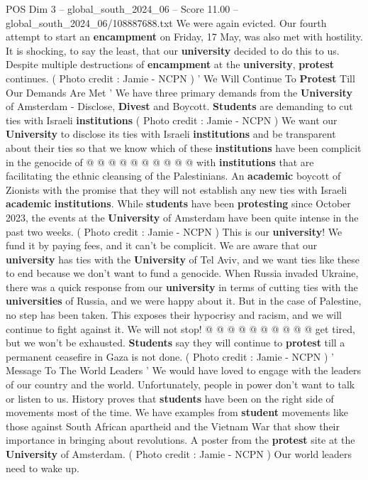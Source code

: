 \begin{textsample}{POS Dim 3 – global\_south\_2024\_06 – Score 11.00 – global\_south\_2024\_06/108887688.txt}
We were again evicted.
Our fourth attempt to start an \textbf{encampment} on Friday, 17 May, was also met with hostility.
It is shocking, to say the least, that our \textbf{university} decided to do this to us.
Despite multiple destructions of \textbf{encampment} at the \textbf{university}, \textbf{protest} continues. ( Photo credit : Jamie - NCPN ) ' We Will Continue To \textbf{Protest} Till Our Demands Are Met ' We have three primary demands from the \textbf{University} of Amsterdam - Disclose, \textbf{Divest} and Boycott. \textbf{Students} are demanding to cut ties with Israeli \textbf{institutions} ( Photo credit : Jamie - NCPN ) We want our \textbf{University} to disclose its ties with Israeli \textbf{institutions} and be transparent about their ties so that we know which of these \textbf{institutions} have been complicit in the genocide of @ @ @ @ @ @ @ @ @ @ with \textbf{institutions} that are facilitating the ethnic cleansing of the Palestinians.
An \textbf{academic} boycott of Zionists with the promise that they will not establish any new ties with Israeli \textbf{academic} \textbf{institutions}.
While \textbf{students} have been \textbf{protesting} since October 2023, the events at the \textbf{University} of Amsterdam have been quite intense in the past two weeks. ( Photo credit : Jamie - NCPN ) This is our \textbf{university}!
We fund it by paying fees, and it can't be complicit.
We are aware that our \textbf{university} has ties with the \textbf{University} of Tel Aviv, and we want ties like these to end because we don't want to fund a genocide.
When Russia invaded Ukraine, there was a quick response from our \textbf{university} in terms of cutting ties with the \textbf{universities} of Russia, and we were happy about it.
But in the case of Palestine, no step has been taken.
This exposes their hypocrisy and racism, and we will continue to fight against it.
We will not stop! @ @ @ @ @ @ @ @ @ @ get tired, but we won't be exhausted. \textbf{Students} say they will continue to \textbf{protest} till a permanent ceasefire in Gaza is not done. ( Photo credit : Jamie - NCPN ) ' Message To The World Leaders ' We would have loved to engage with the leaders of our country and the world.
Unfortunately, people in power don't want to talk or listen to us.
History proves that \textbf{students} have been on the right side of movements most of the time.
We have examples from \textbf{student} movements like those against South African apartheid and the Vietnam War that show their importance in bringing about revolutions.
A poster from the \textbf{protest} site at the \textbf{University} of Amsterdam. ( Photo credit : Jamie - NCPN ) Our world leaders need to wake up.

\end{textsample}
